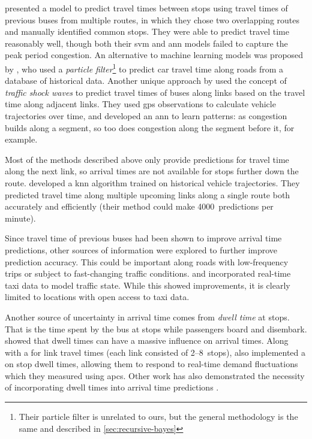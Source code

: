  presented a model to predict travel times between stops using travel times of previous buses from multiple routes, in which they chose two overlapping routes and manually identified common stops. They were able to predict travel time reasonably well, though both their \gls{svm} and \gls{ann} models failed to capture the peak period congestion. An alternative to machine learning models was proposed by \citet{Chen_2014}, who used a \emph{particle filter}\footnote{Their particle filter is unrelated to ours, but the general methodology is the same and described in \cref{sec:recursive-bayes}} to predict car travel time along roads from a database of historical data. Another unique approach by \citet{Julio_2016} used the concept of \emph{traffic shock waves} to predict travel times of buses along links based on the travel time along adjacent links. They used \gls{gps} observations to calculate vehicle trajectories over time, and developed an \gls{ann} to learn patterns: as congestion builds along a segment, so too does congestion along the segment before it, for example.


Most of the methods described above only provide predictions for travel time along the next link, so arrival times are not available for stops further down the route.  developed a \gls{knn} algorithm trained on historical vehicle trajectories. They predicted travel time along multiple upcoming links along a single route both accurately and efficiently (their method could make 4000~predictions per minute).


Since travel time of previous buses had been shown to improve arrival time predictions, other sources of information were explored to further improve prediction accuracy. This could be important along roads with low-frequency trips or subject to fast-changing traffic conditions.  and \citet{Ma_2019} incorporated real-time taxi data to model traffic state. While this showed improvements, it is clearly limited to locations with open access to taxi data.


Another source of uncertainty in arrival time comes from \emph{dwell time} at stops. That is the time spent by the bus at stops while passengers board and disembark.  showed that dwell times can have a massive influence on arrival times. Along with a \kf{} for link travel times (each link consisted of 2--8~stops), \citeauthor{Shalaby_2004} also implemented a \kf{} on stop dwell times, allowing them to respond to real-time demand fluctuations which they measured using \glspl{apc}. Other work has also demonstrated the necessity of incorporating dwell times into arrival time predictions \citep{Jeong_2005,Cats_2015,Cats_2016}.


